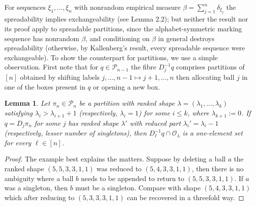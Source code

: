 \documentclass{article}
\newtheorem{lemma}{Lemma}
\begin{document}
For sequences $\xi_1,\ldots,\xi_n$ with nonrandom empirical measure $\beta =\sum_{j=1}^n\delta_{\xi_j}$ the spreadability implies exchangeability (see \cite{Kallenberg} Lemma 2.2);
but neither the result nor its proof apply to spreadable partitions, since the alphabet-symmetric marking sequence has nonrandom $\beta$, and conditioning on $\beta$ in general destroys spreadability
(otherwise, by Kallenberg's result, every spreadable sequence were exchangeable).
To show the counterpart for partitions, we use a simple observation. First note that for $q\in{\mathcal P}_{n-1}$ the fibre   $D_j^{-1}q$ comprises  partitions of $[n] $ obtained by shifting labels
$j,\ldots,n-1\mapsto j+1,\ldots,n$ then allocating ball $j$   in one of the boxes present in $q$ or opening a new box.


\begin{lemma}\label{nostep}
Let $\pi_n\in {\mathcal P}_n$ be a partition with ranked shape $\lambda=(\lambda_1,\ldots,\lambda_k)$  satisfying $\lambda_i>\lambda_{i+1}+1$  {\rm (}respectively, $\lambda_i=1${\rm )} for some $i\leq k$,
where $\lambda_{k+1}:=0$.
If  $q=D_j\pi_n$ for some $j$ has ranked  shape $\lambda'$ with reduced part $\lambda_i'=\lambda_i-1$ {\rm (}respectively, lesser number of singletons{\rm)}, then
$D^{-1}_\ell q \cap\mathcal O_\lambda$ is a one-element set 
 for every $\ell\in [n]$. 
\end{lemma}
\begin{proof} The example best explains the matters.
Suppose by deleting a ball $a$ the  ranked shape $(5,5,3,3,1,1)$ was reduced to $(5,4,3,3,1,1)$, then there is no ambiguity where a ball $b$ needs to be appended to return to $(5,5,3,3,1,1)$. 
If $a$ was a singleton, then $b$ must be a singleton.
Compare with shape $(5,4,3,3,1,1)$ which after reducing to $(5,3,3,3,1,1)$ can be recovered in a threefold way.
\end{proof}
\end{document}

